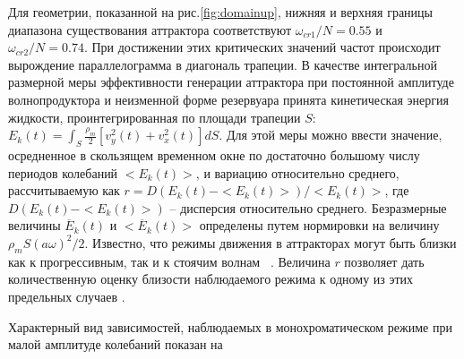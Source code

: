  Для геометрии, показанной на рис.\ref{fig:domainup}, нижняя и верхняя границы диапазона существования аттрактора соответствуют $\omega_{cr1}/N=0.55$ и $\omega_{cr2}/N=0.74$. При достижении этих критических значений частот происходит вырождение параллелограмма в диагональ трапеции. В качестве интегральной размерной меры эффективности генерации аттрактора при постоянной амплитуде волнопродуктора и неизменной форме резервуара принята кинетическая энергия жидкости, проинтегрированная по площади трапеции $S$: $E_{k}(t)=\int_{S}\frac{\rho_{m}}{2}\left[v_{y}^2(t)+v_{x}^2(t)\right]dS$. Для этой меры можно ввести значение, осредненное в скользящем временном окне по достаточно большому числу периодов колебаний $<E_{k}(t)>$, и вариацию относительно среднего, рассчитываемую как $r=D(E_{k}(t)-<E_{k}(t)>)/<E_{k}(t)>$, где $D(E_{k}(t)-<E_{k}(t)>)$ -- дисперсия относительно среднего. Безразмерные величины $\overline{E}_{k}(t)$ и $<\overline{E}_{k}(t)>$ определены путем нормировки на величину $\rho_{m}S(a\omega)^2/2$. Известно, что режимы движения в аттракторах могут быть близки как к прогрессивным, так и к стоячим волнам ~\cite{Brouzetetal2017}. Величина $r$ позволяет дать количественную оценку близости наблюдаемого режима к одному из этих предельных случаев \cite{Brouzetetal2017}. 


Характерный вид зависимостей, наблюдаемых в монохроматическом режиме при малой амплитуде колебаний показан на 

